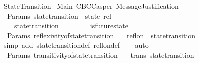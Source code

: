 %
\begin{isabellebody}%
%
%
\isadelimtheory
%
\endisadelimtheory
%
\isatagtheory
{}\isamarkupfalse%
\ StateTransition\isanewline
\isanewline
{}\ Main\ CBCCasper\ MessageJustification\isanewline
\isanewline
{}%
\endisatagtheory
{\isafoldtheory}%
%
\isadelimtheory
\isanewline
%
\endisadelimtheory
\isanewline
\isanewline
\isanewline
\isanewline
\isanewline
{}\isamarkupfalse%
\ {\isacharparenleft}\ Params{\isacharparenright}\ state{\isacharunderscore}transition\ {\isacharcolon}{\isacharcolon}\ {\isachardoublequoteopen}state\ rel{\isachardoublequoteclose}\isanewline
\ \ \ \isanewline
\ \ \ \ {\isachardoublequoteopen}state{\isacharunderscore}transition\ {\isacharequal}\ {\isacharbraceleft}{\isacharparenleft}{\isasymsigma}{}{\isacharcomma}\ {\isasymsigma}{}{\isacharparenright}{\isachardot}\ {\isacharbraceleft}{\isasymsigma}{}{\isacharcomma}\ {\isasymsigma}{}{\isacharbraceright}\ {\isasymsubseteq}\ {\isasymSigma}\ {\isasymand}\ is{\isacharunderscore}future{\isacharunderscore}state{\isacharparenleft}{\isasymsigma}{}{\isacharcomma}\ {\isasymsigma}{}{\isacharparenright}{\isacharbraceright}{\isachardoublequoteclose}\ \isanewline
\isanewline
{}\isamarkupfalse%
\ {\isacharparenleft}\ Params{\isacharparenright}\ reflexivity{\isacharunderscore}of{\isacharunderscore}state{\isacharunderscore}transition\ {\isacharcolon}\isanewline
\ \ {\isachardoublequoteopen}refl{\isacharunderscore}on\ {\isasymSigma}\ state{\isacharunderscore}transition{\isachardoublequoteclose}\ \ \isanewline
%
\isadelimproof
\ \ %
\endisadelimproof
%
\isatagproof
{}\isamarkupfalse%
\ {\isacharparenleft}simp\ add{\isacharcolon}\ state{\isacharunderscore}transition{\isacharunderscore}def\ refl{\isacharunderscore}on{\isacharunderscore}def{\isacharparenright}\isanewline
\ \ \isamarkupfalse%
\ auto%
\endisatagproof
{\isafoldproof}%
%
\isadelimproof
\isanewline
%
\endisadelimproof
\isanewline
{}\isamarkupfalse%
\ {\isacharparenleft}\ Params{\isacharparenright}\ transitivity{\isacharunderscore}of{\isacharunderscore}state{\isacharunderscore}transition\ {\isacharcolon}\isanewline
\ \ {\isachardoublequoteopen}trans\ state{\isacharunderscore}transition{\isachardoublequoteclose}\ \ \isanewline
%
\isadelimproof
\ \ %
\endisadelimproof
%
\isatagproof
{}\isamarkupfalse%

\end{isabellebody}
